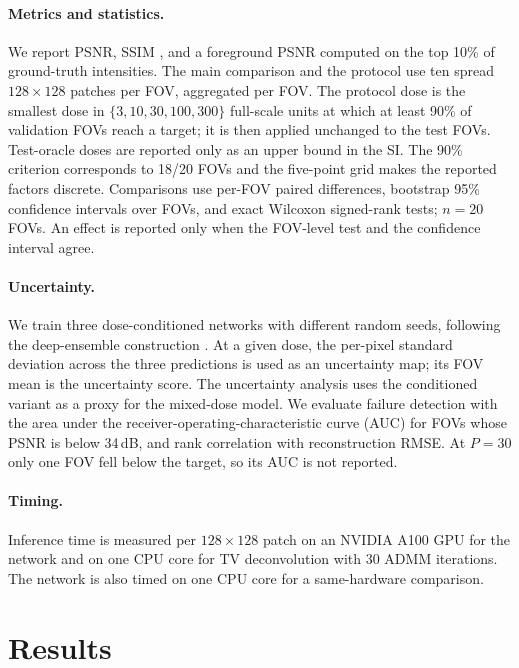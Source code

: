 \documentclass[preprint,12pt]{elsarticle}
\begin{document}
\paragraph{Metrics and statistics.}
We report PSNR, SSIM \cite{wang2004ssim}, and a foreground PSNR computed on the
top 10\% of ground-truth intensities. The main comparison and the protocol use ten spread
$128\times128$ patches per FOV, aggregated per FOV. The protocol dose is the
smallest dose in $\{3,10,30,100,300\}$ full-scale units at which at least 90\%
of validation FOVs reach a target; it is then applied unchanged to the test
FOVs. Test-oracle doses are reported only as an upper bound in the SI. The
90\% criterion corresponds to 18/20 FOVs and the five-point grid makes the
reported factors discrete. Comparisons use per-FOV paired differences,
bootstrap 95\% confidence intervals over FOVs, and exact Wilcoxon signed-rank
tests; $n=20$ FOVs. An effect is reported only when the FOV-level test and the
confidence interval agree. 

\paragraph{Uncertainty.}
We train three dose-conditioned networks with different random seeds, following
the deep-ensemble construction \cite{lakshminarayanan2017ensembles}. At a given
dose, the per-pixel standard deviation across the three predictions is used as
an uncertainty map; its FOV mean is the uncertainty score. The uncertainty
analysis uses the conditioned variant as a proxy for the mixed-dose model. We evaluate failure detection with the
area under the receiver-operating-characteristic curve (AUC) for FOVs whose
PSNR is below 34\,dB, and rank correlation with reconstruction RMSE. At $P=30$
only one FOV fell below the target, so its AUC is not reported.

\paragraph{Timing.}
Inference time is measured per $128\times128$ patch on an NVIDIA A100 GPU for
the network and on one CPU core for TV deconvolution with 30 ADMM iterations.
The network is also timed on one CPU core for a same-hardware comparison.

\section{Results}
\end{document}
